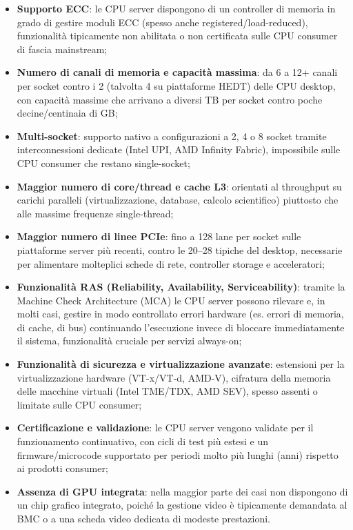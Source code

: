 \documentclass[11pt,a4paper]{article}
\begin{document}
\begin{itemize}[nosep]
    \item \textbf{Supporto ECC}: le CPU server dispongono di un controller di memoria in grado di gestire moduli ECC (spesso anche registered/load-reduced), funzionalità tipicamente non abilitata o non certificata sulle CPU consumer di fascia mainstream;
    \item \textbf{Numero di canali di memoria e capacità massima}: da 6 a 12+ canali per socket contro i 2 (talvolta 4 su piattaforme HEDT) delle CPU desktop, con capacità massime che arrivano a diversi TB per socket contro poche decine/centinaia di GB;
    \item \textbf{Multi-socket}: supporto nativo a configurazioni a 2, 4 o 8 socket tramite interconnessioni dedicate (Intel UPI, AMD Infinity Fabric), impossibile sulle CPU consumer che restano single-socket;
    \item \textbf{Maggior numero di core/thread e cache L3}: orientati al throughput su carichi paralleli (virtualizzazione, database, calcolo scientifico) piuttosto che alle massime frequenze single-thread;
    \item \textbf{Maggior numero di linee PCIe}: fino a 128 lane per socket sulle piattaforme server più recenti, contro le 20--28 tipiche del desktop, necessarie per alimentare molteplici schede di rete, controller storage e acceleratori;
    \item \textbf{Funzionalità RAS (Reliability, Availability, Serviceability)}: tramite la Machine Check Architecture (MCA) le CPU server possono rilevare e, in molti casi, gestire in modo controllato errori hardware (es. errori di memoria, di cache, di bus) continuando l'esecuzione invece di bloccare immediatamente il sistema, funzionalità cruciale per servizi always-on;
    \item \textbf{Funzionalità di sicurezza e virtualizzazione avanzate}: estensioni per la virtualizzazione hardware (VT-x/VT-d, AMD-V), cifratura della memoria delle macchine virtuali (Intel TME/TDX, AMD SEV), spesso assenti o limitate sulle CPU consumer;
    \item \textbf{Certificazione e validazione}: le CPU server vengono validate per il funzionamento continuativo, con cicli di test più estesi e un firmware/microcode supportato per periodi molto più lunghi (anni) rispetto ai prodotti consumer;
    \item \textbf{Assenza di GPU integrata}: nella maggior parte dei casi non dispongono di un chip grafico integrato, poiché la gestione video è tipicamente demandata al BMC o a una scheda video dedicata di modeste prestazioni.
\end{itemize}
\end{document}
